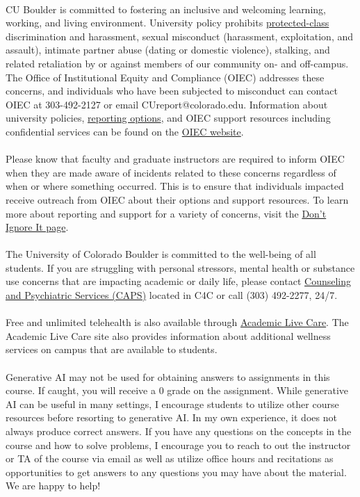 \documentclass[11pt]{article}
\begin{document}
\\
CU Boulder is committed to fostering an inclusive and welcoming learning, working, and living environment. University policy prohibits \href{https://www.colorado.edu/oiec/policies/protected-class-nondiscrimination-policy/protected-class-definitions}{protected-class} discrimination and harassment, sexual misconduct (harassment, exploitation, and assault), intimate partner abuse (dating or domestic violence), stalking, and related retaliation by or against members of our community on- and off-campus. The Office of Institutional Equity and Compliance (OIEC) addresses these concerns, and individuals who have been subjected to misconduct can contact OIEC at 303-492-2127 or email CUreport@colorado.edu. Information about university policies, \href{https://www.colorado.edu/oiec/reporting-resolutions/making-report}{reporting options}, and OIEC support resources including confidential services can be found on the \href{https://www.colorado.edu/oiec/support-resources}{OIEC website}.\\
\\
Please know that faculty and graduate instructors are required to inform OIEC when they are made aware of incidents related to these concerns regardless of when or where something occurred. This is to ensure that individuals impacted receive outreach from OIEC about their options and support resources. To learn more about reporting and support for a variety of concerns, visit the \href{https://www.colorado.edu/dontignoreit/}{Don’t Ignore It page}.\\

\\
The University of Colorado Boulder is committed to the well-being of all students. If you are struggling with personal stressors, mental health or substance use concerns that are impacting academic or daily life, please contact \href{https://www.colorado.edu/counseling/}{Counseling and Psychiatric Services (CAPS)} located in C4C or call (303) 492-2277, 24/7.\\
\\
Free and unlimited telehealth is also available through \href{https://www.colorado.edu/health/academiclivecare}{Academic Live Care}. The Academic Live Care site also provides information about additional wellness services on campus that are available to students.\\

\\
Generative AI may not be used for obtaining answers to assignments in this course.  If caught, you will receive a 0 grade on the assignment.  While generative AI can be useful in many settings, I encourage students to utilize other course resources before resorting to generative AI.  In my own experience, it does not always produce correct answers.  If you have any questions on the concepts in the course and how to solve problems, I encourage you to reach to out the instructor or TA of the course via email as well as utilize office hours and recitations as opportunities to get answers to any questions you may have about the material.  We are happy to help!
\end{document}
